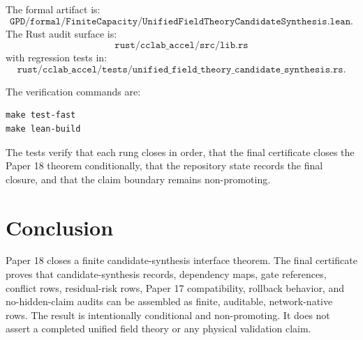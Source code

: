 \documentclass{article}
\begin{document}
The formal artifact is:
\[
\texttt{GPD/formal/FiniteCapacity/UnifiedFieldTheoryCandidateSynthesis.lean}.
\]
The Rust audit surface is:
\[
\texttt{rust/cclab\_accel/src/lib.rs}
\]
with regression tests in:
\[
\texttt{rust/cclab\_accel/tests/unified\_field\_theory\_candidate\_synthesis.rs}.
\]

The verification commands are:

\begin{verbatim}
make test-fast
make lean-build
\end{verbatim}

The tests verify that each rung closes in order, that the final certificate
closes the Paper 18 theorem conditionally, that the repository state records
the final closure, and that the claim boundary remains non-promoting.

\section{Conclusion}

Paper 18 closes a finite candidate-synthesis interface theorem.  The final
certificate proves that candidate-synthesis records, dependency maps, gate
references, conflict rows, residual-risk rows, Paper 17 compatibility,
rollback behavior, and no-hidden-claim audits can be assembled as finite,
auditable, network-native rows.  The result is intentionally conditional and
non-promoting.  It does not assert a completed unified field theory or any
physical validation claim.
\end{document}
